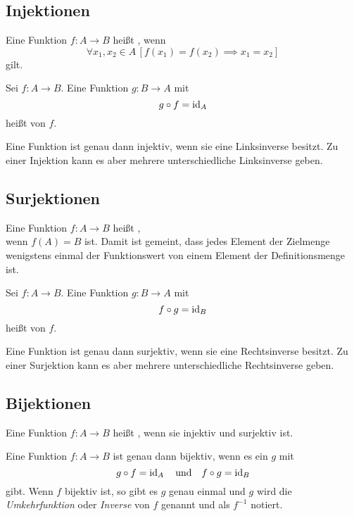 \subsection{Injektionen}
\begin{definition}[Injektion]
Eine Funktion $f\colon A\to B$ heißt ,
wenn
\begin{equation}
\forall x_1,x_2\in A\,[f(x_1)=f(x_2)\implies x_1=x_2]
\end{equation}
gilt.
\end{definition}

\begin{definition}[Linksinverse]
Sei $f\colon A\to B$. Eine Funktion $g\colon B\to A$ mit
\begin{equation}
g\circ f = \operatorname{id}_A
\end{equation}
heißt  von $f$.
\end{definition}
Eine Funktion ist genau dann injektiv, wenn sie eine Linksinverse
besitzt. Zu einer Injektion kann es aber mehrere unterschiedliche
Linksinverse geben.

\subsection{Surjektionen}
\begin{definition}[Surjektion]
Eine Funktion $f\colon A\to B$ heißt ,\\
wenn $f(A)=B$ ist. Damit ist gemeint, dass jedes Element
der Zielmenge wenigstens einmal der Funktionswert von einem
Element der Definitionsmenge ist.
\end{definition}

\begin{definition}[Rechtsinverse]
Sei $f\colon A\to B$. Eine Funktion $g\colon B\to A$ mit
\begin{equation}
f\circ g = \operatorname{id}_B
\end{equation}
heißt  von $f$.
\end{definition}
Eine Funktion ist genau dann surjektiv, wenn sie eine Rechtsinverse
besitzt. Zu einer Surjektion kann es aber mehrere unterschiedliche
Rechtsinverse geben.

\subsection{Bijektionen}
\begin{definition}[Bijektion]
Eine Funktion $f\colon A\to B$ heißt ,
wenn sie injektiv und surjektiv ist.

Eine Funktion $f\colon A\to B$ ist genau dann bijektiv, wenn es
ein $g$ mit
\begin{equation}
g\circ f = \operatorname{id}_A\quad\text{und}\quad f\circ g = \operatorname{id}_B
\end{equation}
gibt. Wenn $f$ bijektiv ist, so gibt es $g$ genau einmal und
$g$ wird die \emph{Umkehrfunktion}
oder \emph{Inverse}
von $f$ genannt und als $f^{-1}$ notiert.
\end{definition}

